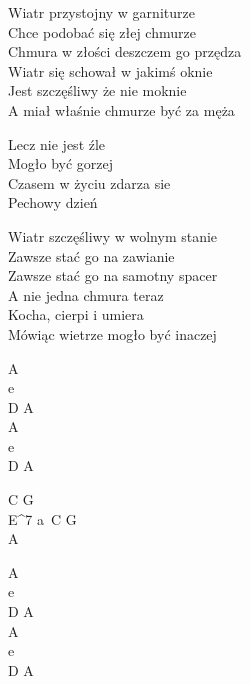 \begin{text}
    Wiatr przystojny w garniturze\\
    Chce podobać się złej chmurze\\
    Chmura  w złości deszczem go przędza\\
    Wiatr się schował w jakimś oknie\\
    Jest szczęśliwy że nie moknie\\
    A miał właśnie chmurze być za męża

    \vin Lecz nie jest źle\\
    \vin Mogło być gorzej\\
    \vin Czasem w życiu zdarza sie\\
    \vin Pechowy dzień

    Wiatr szczęśliwy w wolnym stanie\\
    Zawsze stać go na zawianie\\
    Zawsze stać go na samotny spacer\\
    A nie jedna chmura teraz\\
    Kocha, cierpi i umiera\\
    Mówiąc wietrze mogło być inaczej
\end{text}
\begin{chord}
    A\\
    e\\
    D A\\
    A\\
    e\\
    D A

    C G\\
    E^7 a\
    C G\\
    A

    A\\
    e\\
    D A\\
    A\\
    e\\
    D A
\end{chord}
